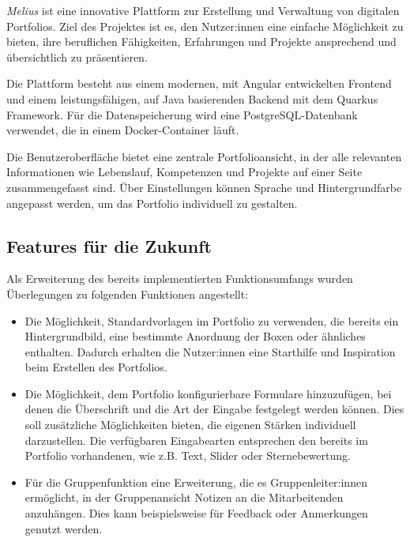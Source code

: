 
\textit{Melius} ist eine innovative Plattform zur Erstellung und Verwaltung von digitalen Portfolios. Ziel des Projektes ist es, den Nutzer:innen eine einfache Möglichkeit zu bieten, ihre beruflichen Fähigkeiten, Erfahrungen und Projekte ansprechend und übersichtlich zu präsentieren.

Die Plattform besteht aus einem modernen, mit Angular entwickelten Frontend und einem leistungsfähigen, auf Java basierenden Backend mit dem Quarkus Framework. Für die Datenspeicherung wird eine PostgreSQL-Datenbank verwendet, die in einem Docker-Container läuft.

Die Benutzeroberfläche bietet eine zentrale Portfolioansicht, in der alle relevanten Informationen wie Lebenslauf, Kompetenzen und Projekte auf einer Seite zusammengefasst sind. Über Einstellungen können Sprache und Hintergrundfarbe angepasst werden, um das Portfolio individuell zu gestalten.

\subsection{Features für die Zukunft}

Als Erweiterung des bereits implementierten Funktionsumfangs wurden Überlegungen zu folgenden Funktionen angestellt:

\begin{itemize}

    \item 
    Die Möglichkeit, Standardvorlagen im Portfolio zu verwenden, die bereits ein Hintergrundbild, eine bestimmte Anordnung der Boxen oder ähnliches enthalten. Dadurch erhalten die Nutzer:innen eine Starthilfe und Inspiration beim Erstellen des Portfolios.

    \item 
    Die Möglichkeit, dem Portfolio konfigurierbare Formulare hinzuzufügen, bei denen die Überschrift und die Art der Eingabe festgelegt werden können. Dies soll zusätzliche Möglichkeiten bieten, die eigenen Stärken individuell darzustellen. Die verfügbaren Eingabearten entsprechen den bereits im Portfolio vorhandenen, wie z.B. Text, Slider oder Sternebewertung.

    \item 
    Für die Gruppenfunktion eine Erweiterung, die es Gruppenleiter:innen ermöglicht, in der Gruppenansicht Notizen an die Mitarbeitenden anzuhängen. Dies kann beispielsweise für Feedback oder Anmerkungen genutzt werden.

\end{itemize}
